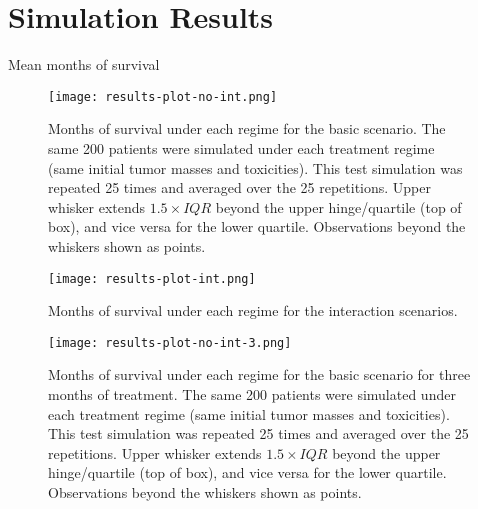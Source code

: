 \documentclass[12pt]{article}
\begin{document}


\section{Simulation Results} %
\label{sec:simulation_results}

Mean months of survival 

\begin{figure}[!tbp]
\begin{center}
\texttt{[image: results-plot-no-int.png]}
\end{center}
\caption[Months of survival under scenarios without interaction]{Months of survival under each regime for the basic scenario. The same 200 patients were simulated under each treatment regime (same initial tumor masses and toxicities). This test simulation was  repeated 25 times and averaged over the 25 repetitions. 
Upper whisker extends $1.5 \times IQR$ beyond the upper hinge/quartile (top of box), and vice versa for the lower quartile. Observations beyond the whiskers shown as points.}
\label{fig:results-no-int}
\end{figure}

\begin{figure}[!tbp]
\begin{center}
\texttt{[image: results-plot-int.png]}
\end{center}
\caption[Months of survival under scenarios with interaction]{Months of survival under each regime for the interaction scenarios.}
\label{fig:results-int}
\end{figure}

\begin{figure}[!tbp]
\begin{center}
\texttt{[image: results-plot-no-int-3.png]}
\end{center}
\caption[Months of survival under scenarios without interaction]{Months of survival under each regime for the basic scenario for three months of treatment. The same 200 patients were simulated under each treatment regime (same initial tumor masses and toxicities). This test simulation was  repeated 25 times and averaged over the 25 repetitions. 
Upper whisker extends $1.5 \times IQR$ beyond the upper hinge/quartile (top of box), and vice versa for the lower quartile. Observations beyond the whiskers shown as points.}
\label{fig:results-no-int}
\end{figure}
\end{document}
